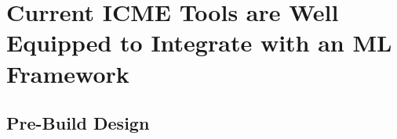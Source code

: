 \section{Current ICME Tools are Well Equipped to Integrate with an ML Framework}
%

\subsection{Pre-Build Design}
%
%



%
%
	
